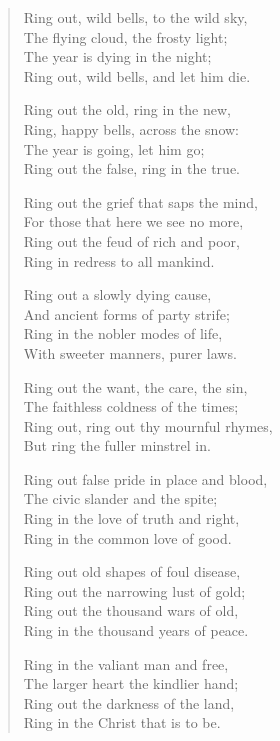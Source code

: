 \documentclass[10pt,a5paper,oneside]{book}
\begin{document}
\begin{verse}
Ring out, wild bells, to the wild sky,\\
The flying cloud, the frosty light;\\
The year is dying in the night;\\
Ring out, wild bells, and let him die.

Ring out the old, ring in the new,\\
Ring, happy bells, across the snow:\\
The year is going, let him go;\\
Ring out the false, ring in the true.

Ring out the grief that saps the mind,\\
For those that here we see no more,\\
Ring out the feud of rich and poor,\\
Ring in redress to all mankind.

Ring out a slowly dying cause,\\
And ancient forms of party strife;\\
Ring in the nobler modes of life,\\
With sweeter manners, purer laws.

Ring out the want, the care, the sin,\\
The faithless coldness of the times;\\
Ring out, ring out thy mournful rhymes,\\
But ring the fuller minstrel in.

Ring out false pride in place and blood,\\
The civic slander and the spite;\\
Ring in the love of truth and right,\\
Ring in the common love of good.

Ring out old shapes of foul disease,\\
Ring out the narrowing lust of gold;\\
Ring out the thousand wars of old,\\
Ring in the thousand years of peace.

Ring in the valiant man and free,\\
The larger heart the kindlier hand;\\
Ring out the darkness of the land,\\
Ring in the Christ that is to be.
\end{verse}

\end{document}
